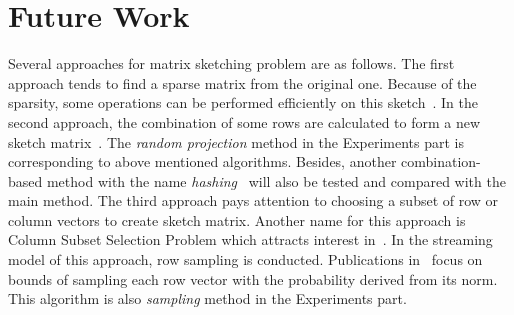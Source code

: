 \documentclass{acm_proc_article-sp}
\begin{document}
\section{Future Work}

Several approaches for matrix sketching problem are as follows. The first approach tends to find a sparse matrix from the original one. Because of the sparsity, some operations can be performed efficiently on this sketch~\cite{ref2, ref3, ref14}. In the second approach, the combination of some rows are calculated to form a new sketch matrix~\cite{ref4, ref5, ref15, ref16}. The \textit{random projection} method in the Experiments part is corresponding to above mentioned algorithms. Besides, another combination-based method with the name \textit{hashing}~\cite{ref6} will also be tested and compared with the main method. The third approach pays attention to choosing a subset of row or column vectors to create sketch matrix. Another name for this approach is Column Subset Selection Problem which attracts interest in~\cite{ref7, ref8, ref9, ref10, ref11}. In the streaming model of this approach, row sampling is conducted. Publications in~\cite{ref11, ref7, ref12, ref13, ref17} focus on bounds of sampling each row vector with the probability derived from its norm. This algorithm is also \textit{sampling} method in the Experiments part.




\end{document}
